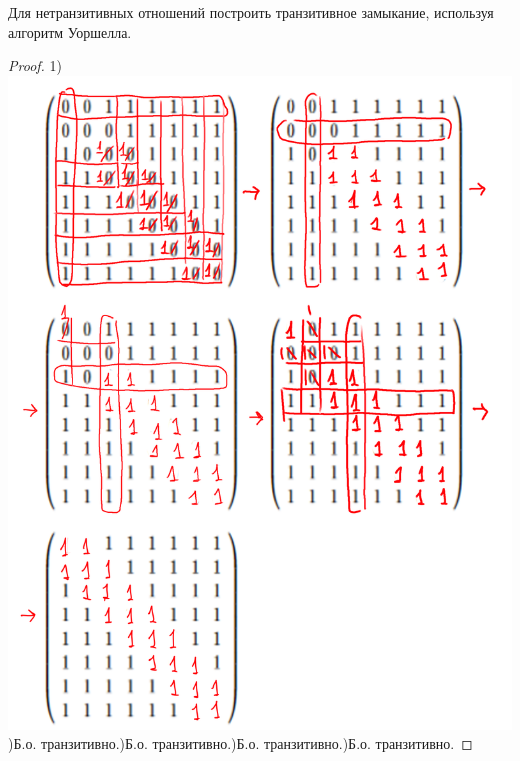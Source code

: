 \begin{problem}
	Для нетранзитивных отношений построить транзитивное замыкание, используя алгоритм Уоршелла.
\end{problem}

\begin{proof}
   1)\newline \includegraphics{замыкание.png})Б.о. транзитивно.)Б.о. транзитивно.)Б.о. транзитивно.)Б.о. транзитивно.\newline
\end{proof}
